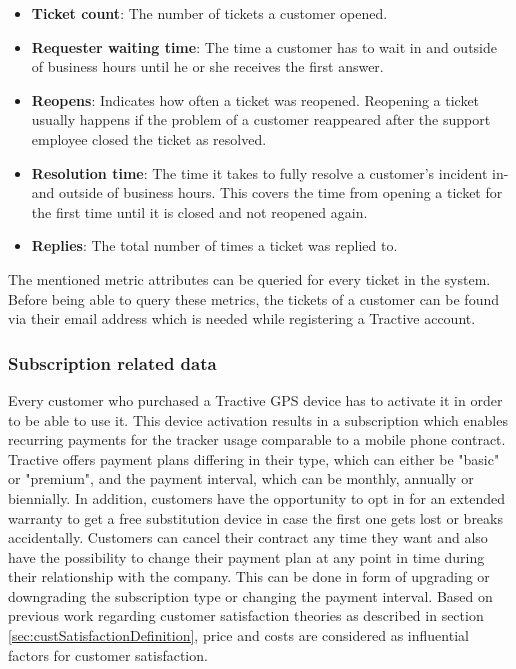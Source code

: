 \begin{itemize}
	\item \textbf{Ticket count}: The number of tickets a customer opened.
	\item \textbf{Requester waiting time}: The time a customer has to wait in and outside of business hours until he or she receives the first answer.
	\item \textbf{Reopens}: Indicates how often a ticket was reopened. Reopening a ticket usually happens if the problem of a customer reappeared after the support employee closed the ticket as resolved.
	\item \textbf{Resolution time}: The time it takes to fully resolve a customer's incident in- and outside of business hours. This covers the time from opening a ticket for the first time until it is closed and not reopened again. 
	\item \textbf{Replies}: The total number of times a ticket was replied to.
\end{itemize}

The mentioned metric attributes can be queried for every ticket in the system. Before being able to query these metrics, the tickets of a customer can be found via their email address which is needed while registering a Tractive account. 

\subsubsection{Subscription related data}
Every customer who purchased a Tractive GPS device has to activate it in order to be able to use it. This device activation results in a subscription which enables recurring payments for the tracker usage comparable to a mobile phone contract. Tractive offers payment plans differing in their type, which can either be "basic" or "premium", and the payment interval, which can be monthly, annually or biennially. In addition, customers have the opportunity to opt in for an extended warranty to get a free substitution device in case the first one gets lost or breaks accidentally. Customers can cancel their contract any time they want and also have the possibility to change their payment plan at any point in time during their relationship with the company. This can be done in form of upgrading or downgrading the subscription type or changing the payment interval. Based on previous work regarding customer satisfaction theories as described in section \ref{sec:custSatisfactionDefinition}, price and costs are considered as influential factors for customer satisfaction. 

